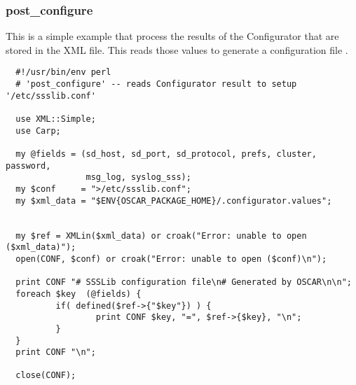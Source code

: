 \subsubsection{post\_configure}

This is a simple  example that process the results
of the Configurator that are stored in the XML 
file.  This reads those values to generate a configuration file
.

\begin{small}
\begin{verbatim}
  #!/usr/bin/env perl
  # 'post_configure' -- reads Configurator result to setup '/etc/ssslib.conf'

  use XML::Simple;
  use Carp;

  my @fields = (sd_host, sd_port, sd_protocol, prefs, cluster, password, 
                msg_log, syslog_sss);
  my $conf     = ">/etc/ssslib.conf";
  my $xml_data = "$ENV{OSCAR_PACKAGE_HOME}/.configurator.values";


  my $ref = XMLin($xml_data) or croak("Error: unable to open ($xml_data)");
  open(CONF, $conf) or croak("Error: unable to open ($conf)\n");

  print CONF "# SSSLib configuration file\n# Generated by OSCAR\n\n";
  foreach $key  (@fields) {
          if( defined($ref->{"$key"}) ) {
                  print CONF $key, "=", $ref->{$key}, "\n";
          }
  }
  print CONF "\n";

  close(CONF);
\end{verbatim}
\end{small}
